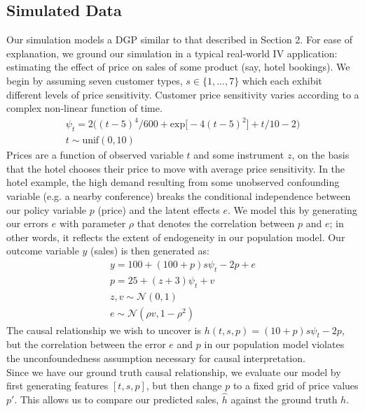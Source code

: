 \documentclass[10.5pt, oneside, twocolumn]{article}   	%
\begin{document}
\subsection{Simulated Data}
Our simulation models a DGP similar to that described in Section 2. For ease of explanation, we ground our simulation in a typical real-world IV application: estimating the effect of price on sales of some product (say, hotel bookings). We begin by assuming seven customer types, $s \in \{1,...,7\}$ which each exhibit different levels of price sensitivity. Customer price sensitivity varies according to a complex non-linear function of time.
\begin{gather*}
\psi_t = 2\big((t-5)^4/600 + \textrm{exp}\big[-4(t-5)^2\big] + t/10 - 2 \big)\\
t \sim \textrm{unif}(0,10)
\end{gather*}
Prices are a function of observed variable $t$ and some instrument $z$, on the basis that the hotel chooses their price to move with average price sensitivity. In the hotel example, the high demand resulting from some unobserved confounding variable (e.g. a nearby conference) breaks the conditional independence between our policy variable $p$ (price) and the latent effects $e$. We model this by generating our errors $e$ with parameter $\rho$ that denotes the correlation between $p$ and $e$; in other words, it reflects the extent of endogeneity in our population model. Our outcome variable $y$ (sales) is then generated as:
\begin{gather*}
y = 100 + (100 + p)s\psi_t - 2p + e \\
p = 25 + (z + 3)\psi_t + v \\
z, v \sim \mathcal{N}(0,1) \\
e \sim \mathcal{N}(\rho v, 1 - \rho^2)
\end{gather*}
The causal relationship we wish to uncover is $h(t, s, p) = (10 + p)s\psi_t - 2p$, but the correlation between the error $e$ and $p$ in our population model violates the unconfoundedness assumption necessary for causal interpretation. \\

Since we have our ground truth causal relationship, we evaluate our model by first generating features $[t, s, p]$, but then change $p$ to a fixed grid of price values $p'$. This allows us to compare our predicted sales, $\hat{h}$ against the ground truth $h$. 
\end{document}
